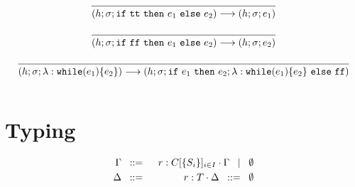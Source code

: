 \documentclass[a4paper]{llncs}
\newcommand{\while}[2]{\ensuremath{\mathtt{while}(#1)\set{#2}}}
\begin{document}
\[\begin{array}{c}
		\tree{
		}{
			(h; \sigma; \ifthenelse{\true}{e_1}{e_2}) \red (h; \sigma; e_1)
		}
		\\[6mm]

		\tree{
		}{
			(h; \sigma; \ifthenelse{\false}{e_1}{e_2}) \red (h; \sigma; e_2)
		}
		\\[6mm]

		\tree{
		}{
			(h; \sigma; \lambda: \while{e_1}{e_2}) \red (h; \sigma; \ifthenelse{e_1}{e_2 ;\lambda: \while{e_1}{e_2}}{\false})
		}
		\\[6mm]

	\end{array}
\]

\section{Typing}

\begin{eqnarray*}
	\Gamma &\;\;::=\;\;& r: C[\{S_i\}]_{i \in I} \cdot \Gamma \;\;\;|\;\;\; \emptyset\\
	\Delta &\;\;::=\;\;& r: T \cdot \Delta \;\;::=\;\; \emptyset 
\end{eqnarray*}
\end{document}
